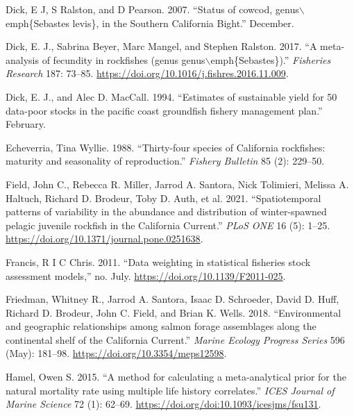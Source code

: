 \documentclass[
  english,
  a4paper,
]{article}
\newlength{\cslhangindent}
\newlength{\cslentryspacingunit} %
\newenvironment{CSLReferences}[2] %
 {%
  \setlength{\parindent}{0pt}
  \ifodd #1
  \let\oldpar\par
  \def\par{\hangindent=\cslhangindent\oldpar}
  \fi
  \setlength{\parskip}{#2\cslentryspacingunit}
 }%
 {}
\begin{document}
\begin{CSLReferences}{1}{0}
\leavevmode{}%
Dick, E J, S Ralston, and D Pearson. 2007. {``{Status of cowcod, genus\(\backslash\)emph{\{}Sebastes levis{\}}, in the Southern California Bight}.''} December.

\leavevmode{}%
Dick, E. J., Sabrina Beyer, Marc Mangel, and Stephen Ralston. 2017. {``{A meta-analysis of fecundity in rockfishes (genus genus\(\backslash\)emph{\{}Sebastes{\}})}.''} \emph{Fisheries Research} 187: 73--85. \url{https://doi.org/10.1016/j.fishres.2016.11.009}.

\leavevmode{}%
Dick, E. J., and Alec D. MacCall. 1994. {``{Estimates of sustainable yield for 50 data-poor stocks in the pacific coast groundfish fishery management plan}.''} February.

\leavevmode{}%
Echeverria, Tina Wyllie. 1988. {``{Thirty-four species of California rockfishes: maturity and seasonality of reproduction}.''} \emph{Fishery Bulletin} 85 (2): 229--50.

\leavevmode{}%
Field, John C., Rebecca R. Miller, Jarrod A. Santora, Nick Tolimieri, Melissa A. Haltuch, Richard D. Brodeur, Toby D. Auth, et al. 2021. {``{Spatiotemporal patterns of variability in the abundance and distribution of winter-spawned pelagic juvenile rockfish in the California Current}.''} \emph{PLoS ONE} 16 (5): 1--25. \url{https://doi.org/10.1371/journal.pone.0251638}.

\leavevmode{}%
Francis, R I C Chris. 2011. {``{Data weighting in statistical fisheries stock assessment models},''} no. July. \url{https://doi.org/10.1139/F2011-025}.

\leavevmode{}%
Friedman, Whitney R., Jarrod A. Santora, Isaac D. Schroeder, David D. Huff, Richard D. Brodeur, John C. Field, and Brian K. Wells. 2018. {``{Environmental and geographic relationships among salmon forage assemblages along the continental shelf of the California Current}.''} \emph{Marine Ecology Progress Series} 596 (May): 181--98. \url{https://doi.org/10.3354/meps12598}.

\leavevmode{}%
Hamel, Owen S. 2015. {``{A method for calculating a meta-analytical prior for the natural mortality rate using multiple life history correlates}.''} \emph{ICES Journal of Marine Science} 72 (1): 62--69. \url{https://doi.org/doi:10.1093/icesjms/fsu131}.


\end{CSLReferences}
\end{document}
